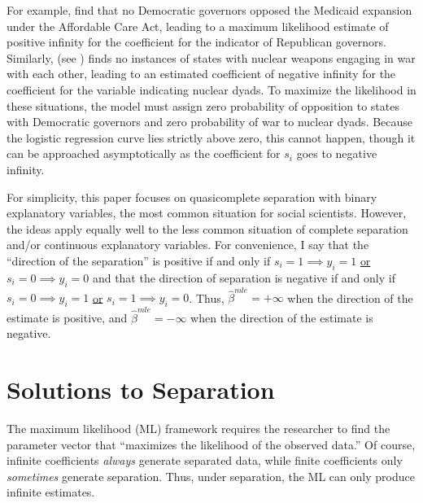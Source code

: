 \documentclass[12pt]{article}
\begin{document}
For example, \cite{BarrilleauxRainey2014} find that no Democratic governors opposed the Medicaid expansion under the Affordable Care Act, leading to a maximum likelihood estimate of positive infinity for the coefficient for the indicator of Republican governors. Similarly, \cite{Rauchhaus2009} (see \citealt{BellMiller2015}) finds no instances of states with nuclear weapons engaging in war with each other, leading to an estimated coefficient of negative infinity for the coefficient for the variable indicating nuclear dyads. To maximize the likelihood in these situations, the model must assign zero probability of opposition to states with Democratic governors and zero probability of war to nuclear dyads. Because the logistic regression curve lies strictly above zero, this cannot happen, though it can be approached asymptotically as the coefficient for $s_i$ goes to negative infinity. 

For simplicity, this paper focuses on quasicomplete separation with binary explanatory variables, the most common situation for social scientists. However, the ideas apply equally well to the less common situation of complete separation and/or continuous explanatory variables.  For convenience, I say that the ``direction of the separation'' is positive if and only if $s_i = 1 \implies y_i = 1$ \underline{or} $s_i = 0 \implies y_i = 0$ and that the direction of separation is negative if and only if $s_i = 0 \implies y_i = 1$ \underline{or} $s_i = 1 \implies y_i = 0$. Thus, $\hat{\beta}^{mle} = +\infty$ when the direction of the estimate is positive, and $\hat{\beta}^{mle} = -\infty$ when the direction of the estimate is negative.

\section*{Solutions to Separation}

The maximum likelihood (ML) framework requires the researcher to find the parameter vector that ``maximizes the likelihood of the observed data.'' Of course, infinite coefficients \textit{always} generate separated data, while finite coefficients only \emph{sometimes} generate separation. Thus, under separation, the ML can only produce infinite estimates.
\end{document}
